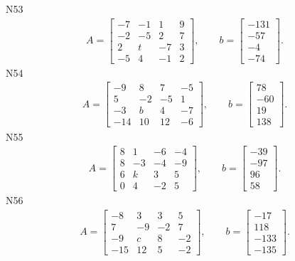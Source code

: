 \documentclass[11pt]{report}
\begin{document}
N53
\begin{align*}
 A = \left[\begin{matrix}-7 & -1 & 1 & 9\\-2 & -5 & 2 & 7\\2 & t & -7 & 3\\-5 & 4 & -1 & 2\end{matrix}\right],
\qquad b = \left[\begin{matrix}-131\\-57\\-4\\-74\end{matrix}\right]. 
 \end{align*}
N54
\begin{align*}
 A = \left[\begin{matrix}-9 & 8 & 7 & -5\\5 & -2 & -5 & 1\\-3 & b & 4 & -7\\-14 & 10 & 12 & -6\end{matrix}\right],
\qquad b = \left[\begin{matrix}78\\-60\\19\\138\end{matrix}\right]. 
 \end{align*}
N55
\begin{align*}
 A = \left[\begin{matrix}8 & 1 & -6 & -4\\8 & -3 & -4 & -9\\6 & k & 3 & 5\\0 & 4 & -2 & 5\end{matrix}\right],
\qquad b = \left[\begin{matrix}-39\\-97\\96\\58\end{matrix}\right]. 
 \end{align*}
N56
\begin{align*}
 A = \left[\begin{matrix}-8 & 3 & 3 & 5\\7 & -9 & -2 & 7\\-9 & c & 8 & -2\\-15 & 12 & 5 & -2\end{matrix}\right],
\qquad b = \left[\begin{matrix}-17\\118\\-133\\-135\end{matrix}\right]. 
 \end{align*}
\end{document}

